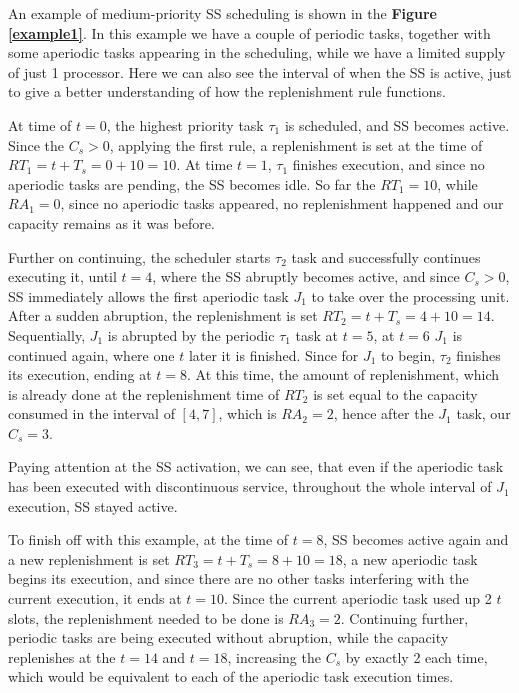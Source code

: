 \documentclass[conference]{IEEEtran}
\begin{document}
An example of medium-priority SS scheduling is shown in the \textbf{Figure \ref{example1}}. In this example we have a couple of periodic tasks, together with some aperiodic tasks appearing in the scheduling, while we have a limited supply of just 1 processor. Here we can also see the interval of when the SS is active, just to give a better understanding of how the replenishment rule functions.

At time of $t = 0$, the highest priority task $\tau_1$ is scheduled, and SS becomes active. Since the $C_s > 0$, applying the first rule, a replenishment is set at the time of $RT_1 = t + T_s = 0 + 10 = 10$. At time $t = 1$, $\tau_1$ finishes execution, and since no aperiodic tasks are pending, the SS becomes idle. So far the $RT_1 = 10$, while $RA_1 = 0$, since no aperiodic tasks appeared, no replenishment happened and our capacity remains as it was before.

Further on continuing, the scheduler starts $\tau_2$ task and successfully continues executing it, until $t = 4$, where the SS abruptly becomes active, and since $C_s > 0$, SS immediately allows the first aperiodic task $J_1$ to take over the processing unit. After a sudden abruption, the replenishment is set $RT_2 = t + T_s = 4 + 10 = 14$. Sequentially, $J_1$ is abrupted by the periodic $\tau_1$ task at $t = 5$, at $t = 6$ $J_1$ is continued again, where one $t$ later it is finished. Since for $J_1$ to begin, $\tau_2$ finishes its execution, ending at $t = 8$. At this time, the amount of replenishment, which is already done at the replenishment time of $RT_2$ is set equal to the capacity consumed in the interval of $[4,7]$, which is $RA_2 = 2$, hence after the $J_1$ task, our $C_s = 3$.

Paying attention at the SS activation, we can see, that even if the aperiodic task has been executed with discontinuous service, throughout the whole interval of $J_1$ execution, SS stayed active.

To finish off with this example, at the time of $t = 8$, SS becomes active again and a new replenishment is set $RT_3 = t + T_s = 8 + 10 = 18$, a new aperiodic task begins its execution, and since there are no other tasks interfering with the current execution, it ends at $t = 10$. Since the current aperiodic task used up 2 $t$ slots, the replenishment needed to be done is $RA_3 = 2$. Continuing further, periodic tasks are being executed without abruption, while the capacity replenishes at the $t = 14$ and $t = 18$, increasing the $C_s$ by exactly 2 each time, which would be equivalent to each of the aperiodic task execution times.
\end{document}
